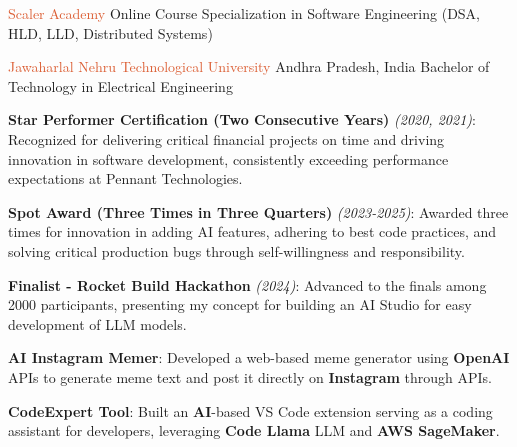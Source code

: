 \documentclass[10pt]{article}
\begin{document}

\headedsection
{\textcolor{db5c31}{Scaler Academy}}
{Online Course}
{Specialization in Software Engineering (DSA, HLD, LLD, Distributed Systems)}
{}

\vspace{-3mm} %

\headedsection
{\textcolor{db5c31}{Jawaharlal Nehru Technological University}}
{Andhra Pradesh, India}
{Bachelor of Technology in Electrical Engineering}
{}
{}


\spacedhrule{-0.8ex}{0.0ex}



\begin{circlist}
    \item \textbf{Star Performer Certification (Two Consecutive Years)} \textit{(2020, 2021)}: Recognized for delivering critical financial projects on time and driving innovation in software development, consistently exceeding performance expectations at Pennant Technologies.
    \item \textbf{Spot Award (Three Times in Three Quarters)} \textit{(2023-2025)}: Awarded three times for innovation in adding AI features, adhering to best code practices, and solving critical production bugs through self-willingness and responsibility.
    \item \textbf{Finalist - Rocket Build Hackathon} \textit{(2024)}: Advanced to the finals among 2000 participants, presenting my concept for building an AI Studio for easy development of LLM models.
\end{circlist}



\spacedhrule{0.8ex}{0.0ex}


\begin{circlist}
    \item \textbf{AI Instagram Memer}: Developed a web-based meme generator using \textbf{OpenAI} APIs to generate meme text and post it directly on \textbf{Instagram} through APIs.
    \item \textbf{CodeExpert Tool}: Built an \textbf{AI}-based VS Code extension serving as a coding assistant for developers, leveraging \textbf{Code Llama} LLM and \textbf{AWS SageMaker}.
\end{circlist}
\end{document}
